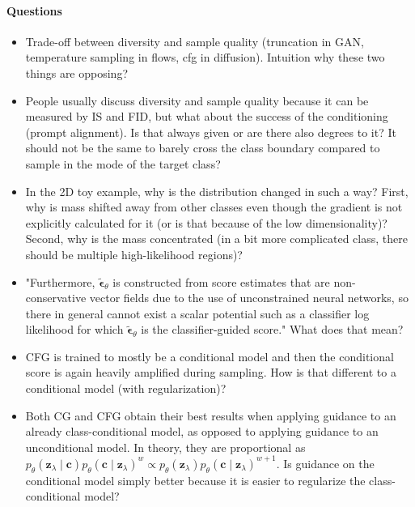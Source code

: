 \documentclass{article}
\begin{document}
\paragraph{Questions}
\begin{itemize}
    \item Trade-off between diversity and sample quality (truncation in GAN, temperature sampling in flows, cfg in diffusion). Intuition why these two things are opposing?
    \item People usually discuss diversity and sample quality because it can be measured by IS and FID, but what about the success of the conditioning (prompt alignment). Is that always given or are there also degrees to it? It should not be the same to barely cross the class boundary compared to sample in the mode of the target class?
    \item In the 2D toy example, why is the distribution changed in such a way? First, why is mass shifted away from other classes even though the gradient is not explicitly calculated for it (or is that because of the low dimensionality)? Second, why is the mass concentrated (in a bit more complicated class, there should be multiple high-likelihood regions)?
    \item "Furthermore, $\tilde{\boldsymbol{\epsilon}}_\theta$ is constructed from score estimates that are non-conservative vector fields due to the use of unconstrained neural networks, so there in general cannot exist a scalar potential such as a classifier log likelihood for which $\tilde{\boldsymbol{\epsilon}}_\theta$ is the classifier-guided score." What does that mean?
    \item CFG is trained to mostly be a conditional model and then the conditional score is again heavily amplified during sampling. How is that different to a conditional model (with regularization)?
    \item Both CG and CFG obtain their best results when applying guidance to an already class-conditional model, as opposed to applying guidance to an unconditional model. In theory, they are proportional as $p_\theta\left(\mathbf{z}_\lambda \mid \mathbf{c}\right) p_\theta\left(\mathbf{c} \mid \mathbf{z}_\lambda\right)^w \propto p_\theta\left(\mathbf{z}_\lambda\right) p_\theta\left(\mathbf{c} \mid \mathbf{z}_\lambda\right)^{w+1}$. Is guidance on the conditional model simply better because it is easier to regularize the class-conditional model?
\end{itemize}
\end{document}
